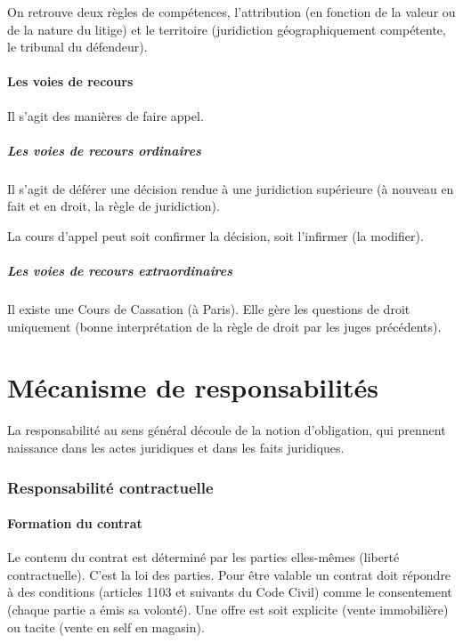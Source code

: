 \documentclass[10pt,a4paper]{article}
\begin{document}
On retrouve deux règles de compétences, l'attribution (en fonction de la valeur ou de la nature du litige) et le territoire (juridiction géographiquement compétente, le tribunal du défendeur).

\subsection{Les voies de recours}

Il s'agit des manières de faire appel.

\subsubsection{Les voies de recours ordinaires}

Il s'agit de déférer une décision rendue à une juridiction supérieure (à nouveau en fait et en droit, la règle de juridiction).

La cours d'appel peut soit confirmer la décision, soit l'infirmer (la modifier).

\subsubsection{Les voies de recours extraordinaires}

Il existe une Cours de Cassation (à Paris). Elle gère les questions de droit uniquement (bonne interprétation de la règle de droit par les juges précédents).

\part{Mécanisme de responsabilités}

La responsabilité au sens général découle de la notion d'obligation, qui prennent naissance dans les actes juridiques et dans les faits juridiques.

\section{Responsabilité contractuelle}

\subsection{Formation du contrat}

Le contenu du contrat est déterminé par les parties elles-mêmes (liberté contractuelle). C'est la loi des parties. Pour être valable un contrat doit répondre à des conditions (articles 1103 et suivants du Code Civil) comme le consentement (chaque partie a émis sa volonté). Une offre est soit explicite (vente immobilière) ou tacite (vente en self en magasin).
\end{document}
